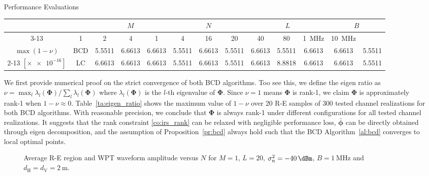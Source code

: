 \documentclass[journal]{IEEEtran}
\begin{document}
\begin{section}{Performance Evaluations}
		\begin{table*}[!t]
			\caption{The maximum value of $1-\nu$ over all R-E samples during BCD and LC-BCD algorithms for all tested channel realizations}
			\label{ta:eigen_ratio}
			\centering
			\begin{tabular}{|c|c|c|c|c|c|c|c|c|c|c|c|c|}
				\hline
				\multicolumn{2}{|c|}{\multirow{2}{*}{}} & \multicolumn{3}{c|}{$M$} & \multicolumn{3}{c|}{$N$} & \multicolumn{3}{c|}{$L$} & \multicolumn{2}{c|}{$B$} \\ \cline{3-13}
				\multicolumn{2}{|c|}{} & \num{1} & \num{2} & \num{4} & \num{1} & \num{4} & \num{16} & \num{20} & \num{40} & \num{80} & \SI{1}{\MHz} & \SI{10}{\MHz} \\ \hline
				$\max(1 - \nu)$ & BCD & \num{5.5511} & \num{6.6613} & \num{6.6613} & \num{5.5511} & \num{6.6613} & \num{5.5511} & \num{6.6613} & \num{5.5511} & \num{6.6613} & \num{6.6613} & \num{5.5511} \\ \cline{2-13}
				$[\times \num{e-16}]$ & LC & \num{6.6613} & \num{6.6613} & \num{6.6613} & \num{5.5511} & \num{6.6613} & \num{5.5511} & \num{6.6613} & \num{8.8818} & \num{6.6613} & \num{6.6613} & \num{5.5511} \\ \hline
			\end{tabular}
		\end{table*}

		We first provide numerical proof on the strict convergence of both BCD algorithms. Too see this, we define the eigen ratio as $\nu=\max_l\lambda_l(\boldsymbol{\Phi})/\sum_l\lambda_l(\boldsymbol{\Phi})$ where $\lambda_l(\boldsymbol{\Phi})$ is the $l$-th eigenvalue of $\boldsymbol{\Phi}$. Since $\nu=1$ means $\boldsymbol{\Phi}$ is rank-\num{1}, we claim $\boldsymbol{\Phi}$ is approximately rank-\num{1} when $1-\nu \approx 0$. Table~\ref{ta:eigen_ratio} shows the maximum value of $1-\nu$ over \num{20} R-E samples of \num{300} tested channel realizations for both BCD algorithms. With reasonable precision, we conclude that $\boldsymbol{\Phi}$ is always rank-\num{1} under different configurations for all tested channel realizations. It suggests that the rank constraint \ref{co:irs_rank} can be relaxed with negligible performance loss, $\bar{\boldsymbol{\phi}}$ can be directly obtained through eigen decomposition, and the assumption of Proposition~\ref{pr:bcd} always hold such that the BCD Algorithm~\ref{al:bcd} converges to local optimal points.

		\begin{figure}[!t]
			\centering
			\caption{Average R-E region and WPT waveform amplitude versus $N$ for $M=1$, $L=20$, $\sigma_n^2=\SI{-40}{\dBm}$, $B=\SI{1}{\MHz}$ and $d_{\mathrm{H}}=d_{\mathrm{V}}=\SI{2}{\meter}$.}
		\end{figure}


\end{section}
\end{document}
